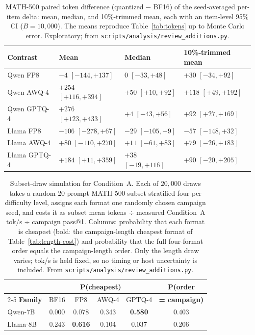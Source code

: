 \documentclass[11pt,a4paper]{article}
\begin{document}
\begin{table}[t]
\centering
\caption{MATH-500 paired token difference (quantized $-$ BF16) of the seed-averaged per-item delta: mean, median, and 10\%-trimmed mean, each with an item-level 95\% CI ($B=10{,}000$). The means reproduce Table~\ref{tab:tokens} up to Monte Carlo error. Exploratory; from \texttt{scripts/analysis/review\_additions.py}.}
\label{tab:toklocation}
\small
\begin{tabular}{llll}
\toprule
\textbf{Contrast} & \textbf{Mean} & \textbf{Median} & \textbf{10\%-trimmed mean} \\
\midrule
Qwen FP8 & $-4$ $[-144,+137]$ & $0$ $[-33,+48]$ & $+30$ $[-34,+92]$ \\
Qwen AWQ-4 & $+254$ $[+116,+394]$ & $+50$ $[+10,+92]$ & $+118$ $[+49,+192]$ \\
Qwen GPTQ-4 & $+276$ $[+123,+433]$ & $+4$ $[-43,+56]$ & $+92$ $[+27,+169]$ \\
\midrule
Llama FP8 & $-106$ $[-278,+67]$ & $-29$ $[-105,+9]$ & $-57$ $[-148,+32]$ \\
Llama AWQ-4 & $+80$ $[-110,+270]$ & $+11$ $[-61,+83]$ & $+79$ $[-26,+183]$ \\
Llama GPTQ-4 & $+184$ $[+11,+359]$ & $+38$ $[-19,+116]$ & $+90$ $[-20,+205]$ \\
\bottomrule
\end{tabular}
\end{table}

\begin{table}[t]
\centering
\caption{Subset-draw simulation for Condition~A. Each of $20{,}000$ draws takes a random 20-prompt MATH-500 subset stratified four per difficulty level, assigns each format one randomly chosen campaign seed, and costs it as subset mean tokens $\div$ measured Condition~A tok/s $\div$ campaign pass@1. Columns: probability that each format is cheapest (bold: the campaign-length cheapest format of Table~\ref{tab:length-cost}) and probability that the full four-format order equals the campaign-length order. Only the length draw varies; tok/s is held fixed, so no timing or host uncertainty is included. From \texttt{scripts/analysis/review\_additions.py}.}
\label{tab:subsetsim}
\small
\begin{tabular}{lccccc}
\toprule
 & \multicolumn{4}{c}{\textbf{P(cheapest)}} & \textbf{P(order} \\
\cmidrule(lr){2-5}
\textbf{Family} & BF16 & FP8 & AWQ-4 & GPTQ-4 & \textbf{= campaign)} \\
\midrule
Qwen-7B & 0.000 & 0.078 & 0.343 & \textbf{0.580} & 0.403 \\
Llama-8B & 0.243 & \textbf{0.616} & 0.104 & 0.037 & 0.206 \\
\bottomrule
\end{tabular}
\end{table}
\end{document}
